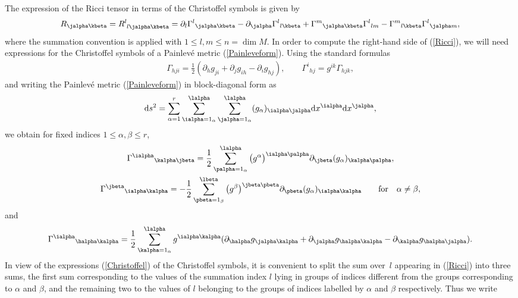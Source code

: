 The expression of the Ricci tensor in terms of the Christoffel symbols is given by
\begin{gather}\label{Ricci}
R_{\jalpha \kbeta}=R^{l}_{{\phantom l} l \jalpha \kbeta}=\partial_{l}{\Gamma^{l}}_{\jalpha \kbeta}-\partial_{\jalpha}{\Gamma^{l}}_{l\kbeta}+{\Gamma^{m}}_{\jalpha \kbeta}{\Gamma^{l}}_{l m}-{\Gamma^{m}}_{l\kbeta}{\Gamma^{l}}_{\jalpha m},
\end{gather}
where the summation convention is applied with $1\leq l,m \leq n = \dim M$. In order to compute the right-hand side of (\ref{Ricci}), we will need expressions for the Christoffel symbols of a Painlev\'e metric (\ref{Painleveform}). Using the standard formulas
\begin{gather*}%
\Gamma_{hji}=\frac{1}{2}(\partial_{h}g_{ji}+\partial_{j}g_{ih}-\partial_{i}g_{hj}), \qquad {\Gamma^{i}}_{hj}=g^{ik}\Gamma_{hjk},
\end{gather*}
and writing the Painlev\'e metric (\ref{Painleveform}) in block-diagonal form as
\[
{\rm d}s^{2}=\sum_{\alpha = 1}^{r}\sum_{\ialpha=1_{\alpha}}^{\lalpha}\sum_{\jalpha=1_{\alpha}}^{\lalpha}(g_{\alpha})_{\ialpha \jalpha}{\rm d}x^{\ialpha}{\rm d}x^{\jalpha},
\]
we obtain for fixed indices $1\leq \alpha,\beta \leq r$,
\begin{gather}
{\Gamma^{\ialpha}}_{\kalpha \jbeta}=\frac{1}{2}\sum_{\palpha=1_{\alpha}}^{\lalpha} \big(g^{\alpha}\big)^{\ialpha \palpha}\partial_{\jbeta}(g_{\alpha})_{\kalpha \palpha},\nonumber\\
 {\Gamma^{\jbeta}}_{\ialpha \kalpha}=-\frac{1}{2}\sum_{\pbeta=1_{\beta}}^{\lbeta}\big(g^{\beta}\big)^{\jbeta \pbeta}\partial_{\pbeta}(g_{\alpha})_{\ialpha \kalpha}\qquad \text{for} \quad \alpha \neq \beta,\label{Christoffel}
\end{gather}
and
\begin{gather}\label{Christoffelmixed}
{\Gamma^{\ialpha}}_{\halpha \kalpha}=\frac{1}{2}\sum_{\kalpha=1_{\alpha}}^{\lalpha} g^{\ialpha \kalpha}(\partial_{\halpha}g_{\jalpha \kalpha}+\partial_{\jalpha}g_{\halpha \kalpha}-\partial_{\kalpha}g_{\halpha \jalpha}).
\end{gather}
In view of the expressions (\ref{Christoffel}) of the Christoffel symbols, it is convenient to split the sum over~$l$ appearing in (\ref{Ricci}) into three sums, the first sum corresponding to the values of the summation index $l$ lying in groups of indices different from the groups corresponding to $\alpha$ and $\beta$, and the remaining two to the values of $l$ belonging to the groups of indices labelled by $\alpha$ and $\beta$ respectively. Thus we write
